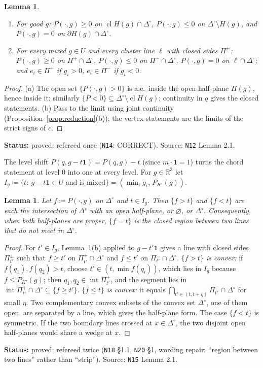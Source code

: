 \documentclass[11pt]{article}
\newtheorem{lemma}[theorem]{Lemma}
\theoremstyle{definition}
\theoremstyle{remark}
\newcommand{\R}{\mathbb R}
\newcommand{\one}{\mathbf 1}
\newcommand{\Di}{\Delta^{\circ}}
\newcommand{\cl}{\operatorname{cl}}
\newcommand{\src}[1]{\texttt{#1}}
\newcommand{\status}[1]{\par\smallskip\noindent\textbf{Status:} #1\par\smallskip}
\begin{document}
\begin{lemma}\label{lem:chords}
\begin{enumerate}[leftmargin=*,label=(\alph*)]
\item For good $g$: $P(\cdot,g)\ge0$ on $\cl H(g)\cap\Di$, $P(\cdot,g)\le0$ on $\Di\setminus H(g)$, and $P(\cdot,g)=0$ on $\partial H(g)\cap\Di$.
\item For every mixed $g\in U$ and every cluster line $\ell$ with closed sides $\Pi^\pm$: $P(\cdot,g)\ge0$ on $\Pi^+\cap\Di$, $P(\cdot,g)\le0$ on $\Pi^-\cap\Di$, $P(\cdot,g)=0$ on $\ell\cap\Di$; and $e_i\in\Pi^+$ if $g_i>0$, $e_i\in\Pi^-$ if $g_i<0$.
\end{enumerate}
\end{lemma}
\begin{proof}
(a) The open set $\{P(\cdot,g)>0\}$ is a.e.\ inside the open half-plane $H(g)$, hence inside it; similarly $\{P<0\}\subseteq\Di\setminus\cl H(g)$; continuity in $q$ gives the closed statements. (b) Pass to the limit using joint continuity (Proposition~\ref{prop:reduction}(b)); the vertex statements are the limits of the strict signs of $c$.
\end{proof}
\status{proved; refereed once (\src{N14}: CORRECT). Source: \src{N12} Lemma 2.1.}

The level shift $P(q,g-t\one)=P(q,g)-t$ (since $m\cdot\one=1$) turns the chord statement at level $0$ into one at every level. For $g\in\R^3$ let $I_g\coloneqq\{t:\ g-t\one\in U\text{ and is mixed}\}=(\min_ig_i,\,P_{K'}(g))$.

\begin{lemma}\label{lem:levels}
Let $f\coloneqq P(\cdot,g)$ on $\Di$ and $t\in I_g$. Then $\{f>t\}$ and $\{f<t\}$ are each the intersection of $\Di$ with an open half-plane, or $\varnothing$, or $\Di$. Consequently, when both half-planes are proper, $\{f=t\}$ is the closed region between two lines that do not meet in $\Di$.
\end{lemma}
\begin{proof}
For $t'\in I_g$, Lemma~\ref{lem:chords}(b) applied to $g-t'\one$ gives a line with closed sides $\Pi^\pm_{t'}$ such that $f\ge t'$ on $\Pi^+_{t'}\cap\Di$ and $f\le t'$ on $\Pi^-_{t'}\cap\Di$. \emph{$\{f>t\}$ is convex:} if $f(q_1),f(q_2)>t$, choose $t'\in(t,\min f(q_i))$, which lies in $I_g$ because $f\le P_{K'}(g)$; then $q_1,q_2\in\operatorname{int}\Pi^+_{t'}$, and the segment lies in $\operatorname{int}\Pi^+_{t'}\cap\Di\subseteq\{f\ge t'\}$. \emph{$\{f\le t\}$ is convex:} it equals $\bigcap_{t'\in(t,t+\eta)}\Pi^-_{t'}\cap\Di$ for small $\eta$. Two complementary convex subsets of the convex set $\Di$, one of them open, are separated by a line, which gives the half-plane form. The case $\{f<t\}$ is symmetric. If the two boundary lines crossed at $x\in\Di$, the two disjoint open half-planes would share a wedge at $x$.
\end{proof}
\status{proved; refereed twice (\src{N18} \S1.1, \src{N20} \S1, wording repair: ``region between two lines'' rather than ``strip''). Source: \src{N15} Lemma 2.1.}
\end{document}
